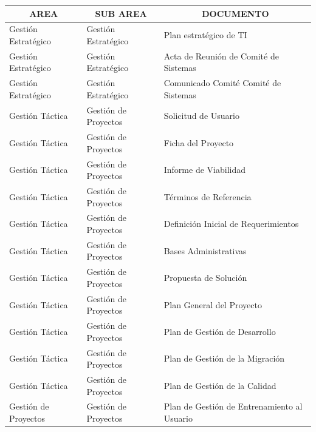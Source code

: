 \documentclass{article}
\begin{document}
\begin{table}[h]
    \begin{tabular}{|l|l|l|}
    \hline
    \multicolumn{1}{|c|}{\textbf{AREA}} & \multicolumn{1}{c|}{\textbf{SUB AREA}} & \multicolumn{1}{c|}{\textbf{DOCUMENTO}}     \\ \hline
    Gestión Estratégico                 & Gestión Estratégico                    & Plan estratégico de TI                      \\ \hline
    Gestión Estratégico                 & Gestión Estratégico                    & Acta de Reunión de Comité de Sistemas       \\ \hline
    Gestión Estratégico                 & Gestión Estratégico                    & Comunicado Comité Comité de Sistemas        \\ \hline
    Gestión Táctica                     & Gestión de Proyectos                   & Solicitud de Usuario                        \\ \hline
    Gestión Táctica                     & Gestión de Proyectos                   & Ficha del Proyecto                          \\ \hline
    Gestión Táctica                     & Gestión de Proyectos                   & Informe de Viabilidad                       \\ \hline
    Gestión Táctica                     & Gestión de Proyectos                   & Términos de Referencia                      \\ \hline
    Gestión Táctica                     & Gestión de Proyectos                   & Definición Inicial de Requerimientos        \\ \hline
    Gestión Táctica                     & Gestión de Proyectos                   & Bases Administrativas                       \\ \hline
    Gestión Táctica                     & Gestión de Proyectos                   & Propuesta de Solución                       \\ \hline
    Gestión Táctica                     & Gestión de Proyectos                   & Plan General del Proyecto                   \\ \hline
    Gestión Táctica                     & Gestión de Proyectos                   & Plan de Gestión de Desarrollo               \\ \hline
    Gestión Táctica                     & Gestión de Proyectos                   & Plan de Gestión de la Migración             \\ \hline
    Gestión Táctica                     & Gestión de Proyectos                   & Plan de Gestión de la Calidad               \\ \hline
    Gestión de Proyectos                & Gestión de Proyectos                   & Plan de Gestión de Entrenamiento al Usuario \\ \hline
    \end{tabular}
\end{table}
\end{document}
